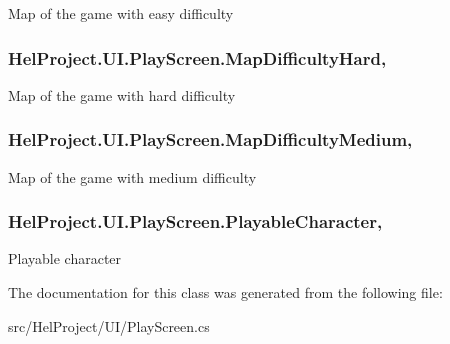 Map of the game with easy difficulty 

\hypertarget{class_hel_project_1_1_u_i_1_1_play_screen_a8dd43c45856c0c6ed338e214e4009d2d}{}
\subsubsection[{Map\+Difficulty\+Hard}]{ Hel\+Project.\+U\+I.\+Play\+Screen.\+Map\+Difficulty\+Hard\hspace{0.3cm}{\ttfamily [get]}, {\ttfamily [set]}}\label{class_hel_project_1_1_u_i_1_1_play_screen_a8dd43c45856c0c6ed338e214e4009d2d}


Map of the game with hard difficulty 

\hypertarget{class_hel_project_1_1_u_i_1_1_play_screen_a4dc67a0bb9e4dfc7fabcb35e45529771}{}
\subsubsection[{Map\+Difficulty\+Medium}]{ Hel\+Project.\+U\+I.\+Play\+Screen.\+Map\+Difficulty\+Medium\hspace{0.3cm}{\ttfamily [get]}, {\ttfamily [set]}}\label{class_hel_project_1_1_u_i_1_1_play_screen_a4dc67a0bb9e4dfc7fabcb35e45529771}


Map of the game with medium difficulty 

\hypertarget{class_hel_project_1_1_u_i_1_1_play_screen_a404ed230e991ee3a7563c23fc053f383}{}
\subsubsection[{Playable\+Character}]{ Hel\+Project.\+U\+I.\+Play\+Screen.\+Playable\+Character\hspace{0.3cm}{\ttfamily [get]}, {\ttfamily [set]}}\label{class_hel_project_1_1_u_i_1_1_play_screen_a404ed230e991ee3a7563c23fc053f383}


Playable character 



The documentation for this class was generated from the following file\+:\begin{DoxyCompactItemize}
\item 
src/\+Hel\+Project/\+U\+I/Play\+Screen.\+cs\end{DoxyCompactItemize}

